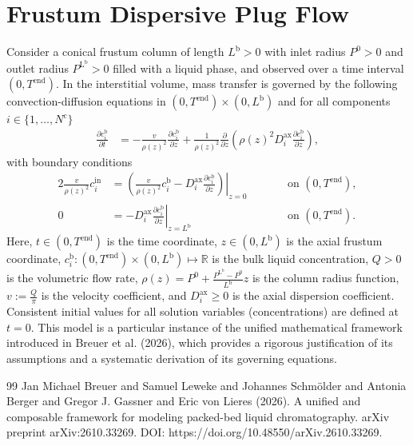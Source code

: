 \documentclass{article}
\begin{document}
\section*{Frustum Dispersive Plug Flow}
Consider a conical frustum column of length $L^{\mathrm{b}} > 0$ with inlet radius $P^{\mathrm{0}} > 0$ and outlet radius $P^{\mathrm{L^{\mathrm{b}}}} > 0$ filled with a liquid phase, and observed over a time interval $(0, T^{\mathrm{end}})$.
In the interstitial volume, mass transfer is governed by the following convection-diffusion equations in $(0, T^{\mathrm{end}})\times (0, L^{\mathrm{b}})$ and for all components $i\in\{1, \dots, N^{\mathrm{c}} \}$
\begin{align}
    \frac{\partial c^{\mathrm{b}}_{i}}{\partial t}
    &= - \frac{v}{\rho(z)^{2}} \frac{\partial c^{\mathrm{b}}_{i}}{\partial z}
        + \frac{1}{\rho(z)^{2}} \frac{\partial}{\partial z} \left( \rho(z)^{2} D^{\mathrm{ax}}_{i} \frac{\partial c^{\mathrm{b}}_{i}}{\partial z} \right),
\end{align}
with boundary conditions
\begin{alignat}{2}
    \frac{v}{\rho(z)^{2}} c^{\mathrm{in}}_{i}
    &= \left.\left( \frac{v}{\rho(z)^{2}} c^{\mathrm{b}}_{i} - D^{\mathrm{ax}}_{i} \frac{\partial c^{\mathrm{b}}_{i}}{\partial z}\right)\right|_{z=0}
    & & \qquad\text{on }(0, T^{\mathrm{end}}),
    \\
    0
    &= - D^{\mathrm{ax}}_{i} \left. \frac{\partial c^{\mathrm{b}}_{i}}{\partial z} \right|_{z=L^{\mathrm{b}}}
    & & \qquad\text{on }(0, T^{\mathrm{end}}).
\end{alignat}
Here, $t\in (0, T^{\mathrm{end}})$ is the time coordinate, $z\in (0, L^{\mathrm{b}})$ is the axial frustum coordinate, $c^{\mathrm{b}}_{i}\colon (0, T^{\mathrm{end}})\times (0, L^{\mathrm{b}}) \mapsto \mathbb{R}$ is the bulk liquid concentration, $Q> 0$ is the volumetric flow rate, $\rho(z) = P^{\mathrm{0}} + \frac{P^{\mathrm{L^{\mathrm{b}}}} - P^{\mathrm{0}}}{L^{\mathrm{b}}} z$ is the column radius function, $v:= \frac{Q}{\pi}$ is the velocity coefficient, and $D^{\mathrm{ax}}_{i}\geq 0$ is the axial dispersion coefficient.
Consistent initial values for all solution variables (concentrations) are defined at $t = 0$.
This model is a particular instance of the unified mathematical framework introduced in Breuer et al. (2026), which provides a rigorous justification of its assumptions and a systematic derivation of its governing equations.
\begin{thebibliography}{99}
     Jan Michael Breuer and Samuel Leweke and Johannes Schmölder and Antonia Berger and Gregor J. Gassner and Eric von Lieres (2026). A unified and composable framework for modeling packed-bed liquid chromatography. arXiv preprint arXiv:2610.33269. DOI: https://doi.org/10.48550/arXiv.2610.33269.
\end{thebibliography}
\end{document}
